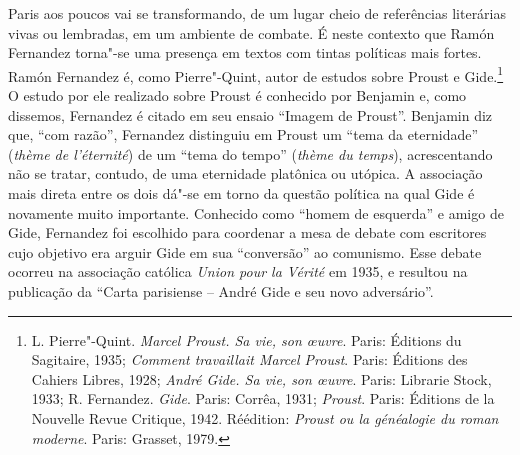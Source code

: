 Paris aos poucos vai se transformando, de um lugar cheio de referências
literárias vivas ou lembradas, em um ambiente de combate. É neste
contexto que Ramón Fernandez torna"-se uma presença em textos com tintas
políticas mais fortes. Ramón Fernandez é, como Pierre"-Quint, autor de
estudos sobre Proust e Gide.\footnote{L. Pierre"-Quint. \emph{Marcel
  Proust. Sa vie, son \oe uvre}. Paris: Éditions du Sagitaire, 1935;
  \emph{Comment travaillait Marcel Proust}. Paris: Éditions des Cahiers Libres,
1928; \emph{André Gide. Sa vie, son \oe uvre}. Paris: Librarie
  Stock, 1933; R. Fernandez. \emph{Gide}. Paris: Corrêa, 1931;
  \emph{Proust}. Paris: Éditions de la Nouvelle Revue Critique, 1942.
  Réédition: \emph{Proust ou la généalogie du roman moderne}. Paris: Grasset,
  1979.} O estudo por ele realizado sobre Proust é conhecido por
Benjamin e, como dissemos, Fernandez é citado em seu ensaio ``Imagem de
Proust''. Benjamin diz que, ``com razão'', Fernandez distinguiu em
Proust um ``tema da eternidade'' (\emph{thème de l'éternité}) de um
``tema do tempo'' (\emph{thème du temps}), acrescentando não se tratar,
contudo, de uma eternidade platônica ou utópica. A associação mais
direta entre os dois dá"-se em torno da questão política na qual Gide é
novamente muito importante. Conhecido como ``homem de esquerda'' e amigo
de Gide, Fernandez foi escolhido para coordenar a mesa de debate com
escritores cujo objetivo era arguir Gide em sua ``conversão'' ao
comunismo. Esse debate ocorreu na associação católica \emph{Union pour la
Vérité} em 1935, e resultou na publicação da ``Carta parisiense  --
André Gide e seu novo adversário''.

